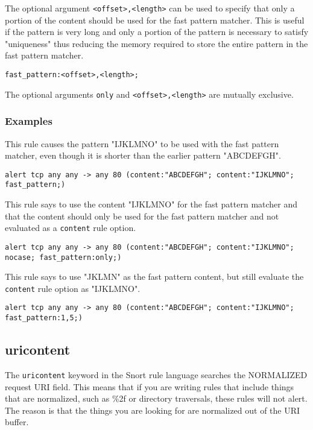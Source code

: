 \documentclass[english]{report}
\newenvironment{note}{
\samepage
    \vspace{10pt}{\textsf{
        {\hspace{7pt}\Huge{$\triangle$\hspace{-12.5pt}{\Large{$^!$}}}}\hspace{5pt}
        {\Large{NOTE}}
    }
    }
   \begin{center}
    \par\vspace{-17pt}

    \begin{lrbox}{\savepar}
    \begin{minipage}[r]{6in}
}
{
    \end{minipage}
    \end{lrbox}
    \fbox{
        \usebox{
            \savepar
	}
    }
    \par\vskip10pt
    \end{center}
}
\newenvironment{note}{
        \begin{rawhtml}
        <p><table border="1"><tr><td><b>
        Note:&nbsp;&nbsp;</b>
        \end{rawhtml}
}{
        \begin{rawhtml}
        </b></td></tr></table></p>
        \end{rawhtml}
}
\begin{document}
The optional argument \texttt{<offset>,<length>} can be used to specify that
only a portion of the content should be used for the fast pattern matcher.
This is useful if the pattern is very long and only a portion of the pattern
is necessary to satisfy "uniqueness" thus reducing the memory required to
store the entire pattern in the fast pattern matcher.
\begin{verbatim}
fast_pattern:<offset>,<length>;
\end{verbatim}

\begin{note}
The optional arguments \texttt{only} and \texttt{<offset>,<length>} are
mutually exclusive.
\end{note}

\subsubsection{Examples}

This rule causes the pattern "IJKLMNO" to be used with the fast pattern matcher,
even though it is shorter than the earlier pattern "ABCDEFGH".

\begin{verbatim}
alert tcp any any -> any 80 (content:"ABCDEFGH"; content:"IJKLMNO"; fast_pattern;)
\end{verbatim}

This rule says to use the content "IJKLMNO" for the fast pattern matcher and that
the content should only be used for the fast pattern matcher and not evaluated
as a \texttt{content} rule option.
\begin{verbatim}
alert tcp any any -> any 80 (content:"ABCDEFGH"; content:"IJKLMNO"; nocase; fast_pattern:only;)
\end{verbatim}

This rule says to use "JKLMN" as the fast pattern content, but still evaluate
the \texttt{content} rule option as "IJKLMNO".
\begin{verbatim}
alert tcp any any -> any 80 (content:"ABCDEFGH"; content:"IJKLMNO"; fast_pattern:1,5;)
\end{verbatim}

\subsection{uricontent}
\label{sub:UriContent}

The \texttt{uricontent} keyword in the Snort rule language searches the
NORMALIZED request \textsc{URI} field.  This means that if you are writing
rules that include things that are normalized, such as \%2f or directory
traversals, these rules will not alert.  The reason is that the things you are
looking for are normalized out of the URI buffer.  
\end{document}
